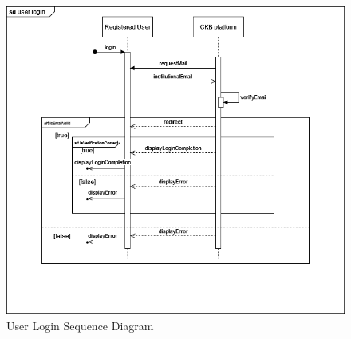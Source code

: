 \begin{center}
    \begin{figure} [H]
        \begin{center}
            \includegraphics[width=0.9\linewidth]{Images/SequenceDiagrams/SD_2.png}
            \caption{User Login Sequence Diagram}
            \label{fig: user_login_seq_diag}
        \end{center}
    \end{figure}
\end{center}


